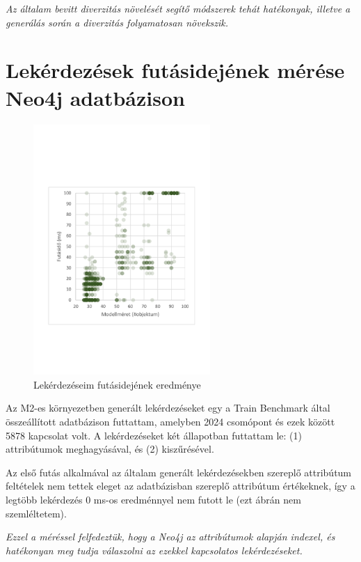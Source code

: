 \textit{Az általam bevitt diverzitás növelését segítő módszerek tehát hatékonyak, illetve a generálás során a diverzitás folyamatosan növekszik.}

\section{Lekérdezések futásidejének mérése Neo4j adatbázison}

\begin{figure}[htp]
	\centering
	\includegraphics[width=0.6\textwidth]{figures/measurementRuntimeResultNeo4J}
	\caption{Lekérdezéseim futásidejének eredménye}
	\label{fig:Neo4jRuntime}
\end{figure}

Az M2-es környezetben generált lekérdezéseket egy a Train Benchmark által összeállított adatbázison futtattam, amelyben 2024 csomópont és ezek között 5878 kapcsolat volt.
A lekérdezéseket két állapotban futtattam le: (1) attribútumok meghagyásával, és (2) kiszűrésével.
 

Az első futás alkalmával az általam generált lekérdezésekben szereplő attribútum feltételek nem tettek eleget az adatbázisban szereplő attribútum értékeknek, így a legtöbb lekérdezés 0 ms-os eredménnyel nem futott le (ezt ábrán nem szemléltetem).

\textit{Ezzel a méréssel felfedeztük, hogy a Neo4j az attribútumok alapján indexel, és hatékonyan meg tudja válaszolni az ezekkel kapcsolatos lekérdezéseket.}

